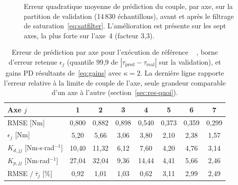 \documentclass[a4paper, oneside]{article}
\newcommand{\code}[1]{%
    \mbox{\ttfamily\small%
        \detokenize{#1}%
    }%
}
\newcommand{\taupred}{\ensuremath{\tau_{\mathrm{pred}}}}
\newcommand{\taureal}{\ensuremath{\tau_{\mathrm{real}}}}
\begin{document}
\begin{figure}[htbp]
\centering
{}
\caption{Erreur quadratique moyenne de prédiction du couple, par axe, sur la
partition de validation (14\,830 échantillons), avant et après le filtrage de
saturation~\eqref{eq:satfilter}. L'amélioration est présente sur les sept axes,
la plus forte sur l'axe~4 (facteur 3{,}3).}
\label{fig:rmse}
\end{figure}

\begin{table}[htbp]
\centering
\caption{Erreur de prédiction par axe pour l'exécution de référence
\code{isaac-satfix}, borne d'erreur retenue $\epsilon_j$ (quantile 99{,}9 de
$|\taupred - \taureal|$ sur la validation), et gains PD résultants
de~\eqref{eq:gains} avec $\kappa = 2$. La dernière ligne rapporte l'erreur
relative à la limite de couple de l'axe, seule grandeur comparable d'un axe à
l'autre (section~\ref{sec:res-quoi}).}
\label{tab:perjoint}
\small
\begin{tabular}{@{}lccccccc@{}}
\toprule
Axe $j$ & 1 & 2 & 3 & 4 & 5 & 6 & 7 \\
\midrule
RMSE [Nm] & 0{,}800 & 0{,}882 & 0{,}898 & 0{,}540 & 0{,}373 & 0{,}359
& 0{,}299 \\
$\epsilon_j$ [Nm] & 5{,}20 & 5{,}66 & 3{,}06 & 3{,}80 & 2{,}10 & 2{,}38
& 1{,}57 \\
$K_{d,jj}$ [Nm$\cdot$s$\cdot$rad$^{-1}$] & 10{,}40 & 11{,}32 & 6{,}12 & 7{,}60
& 4{,}20 & 4{,}76 & 3{,}14 \\
$K_{p,jj}$ [Nm$\cdot$rad$^{-1}$] & 27{,}04 & 32{,}04 & 9{,}36 & 14{,}44
& 4{,}41 & 5{,}66 & 2{,}46 \\
\midrule
RMSE $/\ \bar{\tau}_j$ [\%] & 0{,}92 & 1{,}01 & 1{,}03 & 0{,}62 & 3{,}11
& 2{,}99 & 2{,}49 \\
\bottomrule
\end{tabular}
\end{table}
\end{document}
